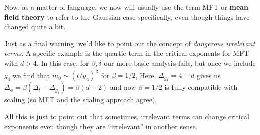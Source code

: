 \documentclass{article}
\theoremstyle{definition}
\begin{document}
Now, as a matter of language, we now will usually use the term MFT or
\textbf{mean field theory} to refer to the Gaussian case specifically, even
though things have changed quite a bit.

Just as a final warning, we'd like to point out the concept of \textit{dangerous
irrelevant terms}. A specific example is the quartic term in the critical
exponents for MFT with $d > 4$. In this case, for $\beta, \delta$ our more basic
analysis fails, but once we include $g_4$ we find that $m_0 \sim (t /
g_4)^\beta$ for $\beta = 1/2$, Here, $\Delta_{g_4} = 4 - d$ gives us
$\Delta_\phi = \beta(\Delta_t - \Delta_{g_4}) = \beta (d - 2)$ and now $\beta =
1/2$ is fully compatible with scaling (so MFT and the scaling approach agree).

All this is just to point out that sometimes, irrelevant terms can change
critical exponeents even though they are ``irrelevant'' in another sense.
\end{document}
